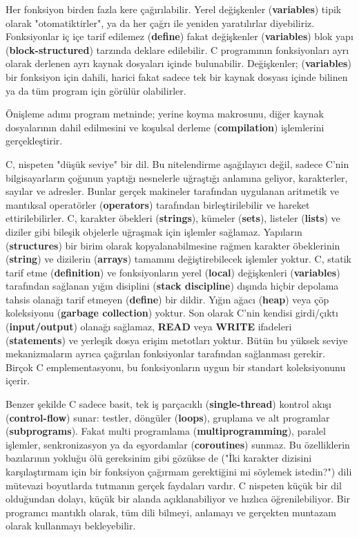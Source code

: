 \documentclass[a4paper,12pt,oneside]{book}
\begin{document}
\thispagestyle{introduction} \noindent Her fonksiyon  birden fazla kere çağırılabilir. Yerel değişkenler (\textbf{variables}) tipik olarak "otomatiktirler", ya da her çağrı ile yeniden yaratılırlar diyebiliriz. Fonksiyonlar  iç içe tarif edilemez (\textbf{define}) fakat değişkenler (\textbf{variables}) blok yapı (\textbf{block-structured}) tarzında deklare edilebilir. C programının fonksiyonları  ayrı olarak derlenen ayrı kaynak dosyaları içinde bulunabilir. Değişkenler; (\textbf{variables}) bir fonksiyon  için dahili, harici fakat sadece tek bir kaynak dosyası içinde bilinen ya da tüm program için görülür olabilirler.
\par Önişleme adımı program metninde; yerine koyma makrosunu, diğer kaynak dosyalarının dahil edilmesini ve koşulsal derleme (\textbf{compilation}) işlemlerini gerçekleştirir. \newline
\par C, nispeten "düşük seviye" bir dil. Bu nitelendirme aşağılayıcı değil, sadece C'nin bilgisayarların çoğunun yaptığı nesnelerle uğraştığı anlamına geliyor, karakterler, sayılar ve adresler. Bunlar gerçek makineler tarafından uygulanan aritmetik ve mantıksal operatörler (\textbf{operators}) tarafından birleştirilebilir ve hareket ettirilebilirler. C, karakter öbekleri (\textbf{strings}), kümeler (\textbf{sets}), listeler (\textbf{lists}) ve diziler gibi bileşik objelerle uğraşmak için işlemler sağlamaz. Yapıların (\textbf{structures}) bir birim olarak kopyalanabilmesine rağmen karakter öbeklerinin (\textbf{string}) ve dizilerin (\textbf{arrays}) tamamını değiştirebilecek işlemler yoktur. C, statik tarif etme (\textbf{definition}) ve fonksiyonların  yerel (\textbf{local}) değişkenleri (\textbf{variables}) tarafından sağlanan yığın disiplini (\textbf{stack discipline}) dışında hiçbir depolama tahsis olanağı tarif etmeyen (\textbf{define}) bir dildir. Yığın ağacı (\textbf{heap}) veya çöp koleksiyonu (\textbf{garbage collection}) yoktur. Son olarak C'nin kendisi girdi/çıktı (\textbf{input/output}) olanağı sağlamaz, \textbf{READ} veya \textbf{WRITE} ifadeleri (\textbf{statements}) ve yerleşik dosya erişim metotları yoktur. Bütün bu yüksek seviye mekanizmaların ayrıca çağırılan fonksiyonlar  tarafından sağlanması gerekir. Birçok C emplementasyonu, bu fonksiyonların  uygun bir standart koleksiyonunu içerir.
\par Benzer şekilde C sadece basit, tek iş parçacıklı (\textbf{single-thread}) kontrol akışı (\textbf{control-flow}) sunar: testler, döngüler (\textbf{loops}), gruplama ve alt programlar (\textbf{subprograms}). Fakat multi programlama (\textbf{multiprogramming}), paralel işlemler, senkronizasyon ya da eşyordamlar (\textbf{coroutines}) sunmaz. Bu özelliklerin bazılarının yokluğu ölü gereksinim gibi gözükse de ("İki karakter dizisini karşılaştırmam için bir fonksiyon  çağırmam gerektiğini mi söylemek istedin?") dili mütevazi boyutlarda tutmanın gerçek faydaları vardır. C nispeten küçük bir dil olduğundan dolayı, küçük bir alanda açıklanabiliyor ve hızlıca öğrenilebiliyor. Bir programcı mantıklı olarak, tüm dili bilmeyi, anlamayı ve gerçekten muntazam olarak kullanmayı bekleyebilir. \pagebreak
\end{document}
